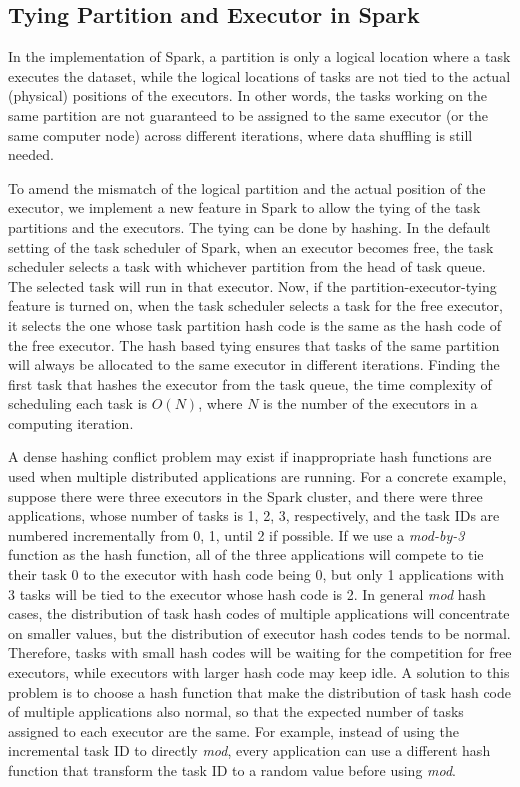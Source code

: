 \documentclass[10pt,journal,compsoc]{IEEEtran}
\begin{document}
\subsection{Tying Partition and Executor in Spark}
In the implementation of Spark, a partition is only a logical location
where a task executes the dataset, while the logical locations of
tasks are not tied to the actual (physical) positions of the
executors.
In other words, %
the tasks working on the same partition are not guaranteed to be
assigned to the same executor (or the same computer node) across
different iterations, where data shuffling is still needed.

To amend the mismatch of the logical partition and the actual position
of the executor, we implement a new feature in Spark to allow the
tying of the task partitions and the executors.
The tying can be done by hashing. %
In the default setting of the task scheduler of Spark, when an executor
becomes free, the task scheduler selects a task with whichever partition
from the head of task queue. The selected task will run in that
executor.
Now, if the partition-executor-tying feature is turned on, when the task scheduler selects a task for the free executor, 
it selects the one whose task partition hash code is the same as the hash code of the free executor. 
The hash based tying ensures that tasks of the same partition will always be allocated to the same executor in different iterations. 
Finding the first task that hashes the executor from the task queue, 
the time complexity of scheduling each task is $O(N)$, 
where $N$ is the number of the executors in a computing iteration. 

A dense hashing conflict problem may exist if inappropriate hash functions are used when multiple distributed applications are running. 
For a concrete example, suppose there were three executors in the Spark cluster, 
and there were three applications, whose number of tasks is 1, 2, 3, respectively, and the task IDs are numbered incrementally from 0, 1, 
until 2 if possible. 
If we use a \emph{mod-by-3} function as the hash function, all of the three applications 
will compete to tie their task 0 to the executor with hash code being 0, 
but only 1 applications with 3 tasks will be tied to the executor
whose hash code is 2.
In general \emph{mod} hash cases, the distribution of task hash codes of multiple applications
will concentrate on smaller values, but the distribution of executor hash codes 
tends to be normal. Therefore, tasks with small hash codes will be waiting 
for the competition for free executors, while executors with larger hash code 
may keep idle.
A solution to this problem is to choose a hash function that make 
the distribution of task hash code of multiple applications also normal, 
so that the expected number of tasks assigned to each executor are the same.
For example, instead of using the incremental task ID to directly \emph{mod}, every application can use a different hash function that transform the task ID to a random value before using \emph{mod}.
\end{document}
